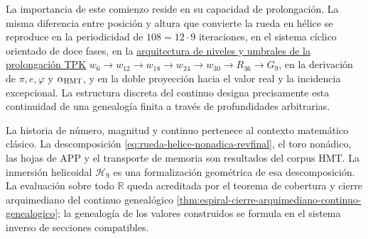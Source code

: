 La importancia de este comienzo reside en su capacidad de prolongación. La
misma diferencia entre posición y altura que convierte la rueda en hélice se
reproduce en la periodicidad de \(108=12\cdot9\) iteraciones, en el sistema
cíclico orientado de doce fases, en la
\hyperref[sec:umbrales-prolongacion-tpk-inaugural]{arquitectura de niveles y
umbrales de la prolongación TPK}
\(w_6\to w_{12}\to w_{18}\to w_{24}\to w_{30}\to R_{36}\to G_9\), en la derivación de
\(\pi,e,\varphi\) y \(\alpha_{\rm HMT}\), y en la doble proyección hacia el
valor real y la incidencia excepcional. La estructura discreta del continuo
designa precisamente esta continuidad de una genealogía finita a través de
profundidades arbitrarias.

\begin{statusbox}
La historia de número, magnitud y continuo pertenece al contexto matemático
clásico. La descomposición \eqref{eq:rueda-helice-nonadica-revfinal}, el toro
nonádico, las hojas de APP y el transporte de memoria son resultados del
corpus HMT. La inmersión helicoidal \(\mathcal H_9\) es una formalización
geométrica de esa descomposición. La evaluación sobre todo \(\mathbb R\)
queda acreditada por el teorema de cobertura y cierre arquimediano del
continuo genealógico
\cref{thm:espiral-cierre-arquimediano-continuo-genealogico}; la genealogía de
los valores construidos se formula en el sistema inverso de secciones
compatibles.
\end{statusbox}
